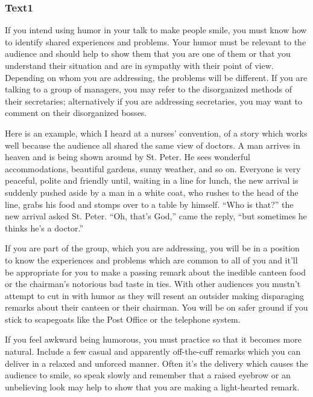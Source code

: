 \documentclass[a4paper]{article}
\begin{document}
\subsubsection{Text1}

\par
If you intend using humor in your talk to make people smile, you must know how to identify shared experiences and problems. Your humor must be relevant to the audience and should help to show them that you are one of them or that you understand their situation and are in sympathy with their point of view. Depending on whom you are addressing, the problems will be different. If you are talking to a group of managers, you may refer to the disorganized methods of their secretaries; alternatively if you are addressing secretaries, you may want to comment on their disorganized bosses.

\par
Here is an example, which I heard at a nurses’ convention, of a story which works well because the audience all shared the same view of doctors. A man arrives in heaven and is being shown around by St. Peter. He sees wonderful accommodations, beautiful gardens, sunny weather, and so on. Everyone is very peaceful, polite and friendly until, waiting in a line for lunch, the new arrival is suddenly pushed aside by a man in a white coat, who rushes to the head of the line, grabs his food and stomps over to a table by himself. “Who is that?” the new arrival asked St. Peter. “Oh, that’s God,” came the reply, “but sometimes he thinks he’s a doctor.”

\par
If you are part of the group, which you are addressing, you will be in a position to know the experiences and problems which are common to all of you and it’ll be appropriate for you to make a passing remark about the inedible canteen food or the chairman’s notorious bad taste in ties. With other audiences you mustn’t attempt to cut in with humor as they will resent an outsider making disparaging remarks about their canteen or their chairman. You will be on safer ground if you stick to scapegoats like the Post Office or the telephone system.

\par
If you feel awkward being humorous, you must practice so that it becomes more natural. Include a few casual and apparently off-the-cuff remarks which you can deliver in a relaxed and unforced manner. Often it’s the delivery which causes the audience to smile, so speak slowly and remember that a raised eyebrow or an unbelieving look may help to show that you are making a light-hearted remark.
\end{document}

